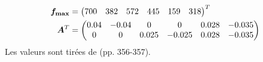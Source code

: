 \documentclass[pdftex,a4paper,11pt]{article}
\begin{document}
\begin{align*}
  \boldsymbol{f_{\max}} & = \begin{pmatrix}700 & 382 & 572 & 445 & 159 & 318\end{pmatrix}^T \\
  \boldsymbol{A}^T      & = \begin{pmatrix}0.04 & -0.04 & 0     & 0      & 0.028 & -0.035 \\
                                   0    & 0     & 0.025 & -0.025 & 0.028 & -0.035 \\\end{pmatrix} \\
\end{align*}
Les valeurs sont tirées de \cite{katayama1993} (pp. 356-357).


\newpage

%


\end{document}
